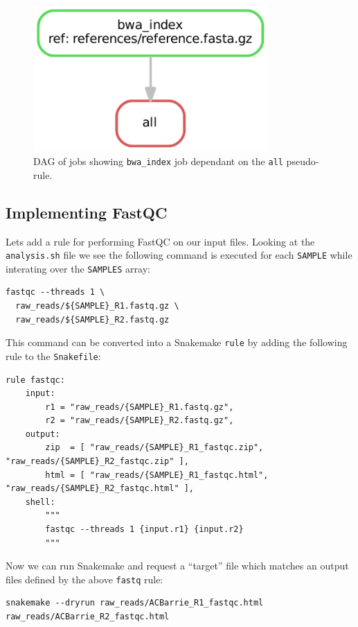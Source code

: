 \begin{figure}[H]
\centering
\includegraphics[width=0.8\textwidth]{handout/dag1.pdf}
\caption{DAG of jobs showing \texttt{bwa\_index} job dependant on the \texttt{all} pseudo-rule.}
\label{fig:dag1}
\end{figure}

\subsection{Implementing FastQC}

Lets add a rule for performing FastQC on our input files. Looking at the \texttt{analysis.sh} file we see the following command
is executed for each \texttt{SAMPLE} while interating over the \texttt{SAMPLES} array:

\begin{lstlisting}
fastqc --threads 1 \
  raw_reads/${SAMPLE}_R1.fastq.gz \
  raw_reads/${SAMPLE}_R2.fastq.gz
\end{lstlisting}

This command can be converted into a Snakemake \texttt{rule} by adding the following rule to the \texttt{Snakefile}:

\begin{lstlisting}
rule fastqc:
	input:
		r1 = "raw_reads/{SAMPLE}_R1.fastq.gz",
		r2 = "raw_reads/{SAMPLE}_R2.fastq.gz",
	output:
		zip  = [ "raw_reads/{SAMPLE}_R1_fastqc.zip", "raw_reads/{SAMPLE}_R2_fastqc.zip" ],
		html = [ "raw_reads/{SAMPLE}_R1_fastqc.html", "raw_reads/{SAMPLE}_R2_fastqc.html" ],
	shell:
		"""
		fastqc --threads 1 {input.r1} {input.r2}
		"""
\end{lstlisting}

Now we can run Snakemake and request a ``target'' file which matches an output files defined by the above \texttt{fastq} rule:

\begin{lstlisting}
snakemake --dryrun raw_reads/ACBarrie_R1_fastqc.html raw_reads/ACBarrie_R2_fastqc.html
\end{lstlisting}

